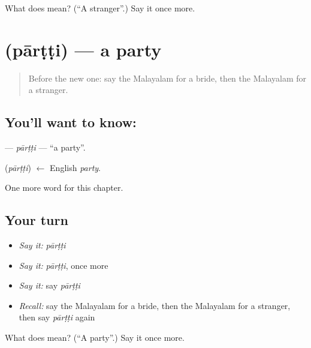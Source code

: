 \begin{tcolorbox}[breakable,colback=teal!4,colframe=teal!35!black,title={Before you move on}]
What does  mean? (\textquotedblleft{}A stranger\textquotedblright{}.) Say it once more.
\end{tcolorbox}
\section[\texorpdfstring{\ml{പാർട്ടി} (pārṭṭi)}{പാർട്ടി (pārṭṭi)}]{ (pārṭṭi) — a party}

\label{lesson:ML-C211-partti}



\begin{quote}
Before the new one: say the Malayalam for a bride, then the Malayalam for a stranger.
\end{quote}

\subsection*{You'll want to know: }
\textbf{} — \emph{pārṭṭi} — \textquotedblleft{}a party\textquotedblright{}.

\begin{cousinweb}
\textbf{} (\emph{pārṭṭi}) $\leftarrow$ English \emph{party}.
\end{cousinweb}

\begin{grammarlens}[title={What you've built}]
One more word for this chapter.
\end{grammarlens}

\subsection*{Your turn}
\begin{itemize}
\raggedright
  \item \emph{Say it:} \emph{pārṭṭi}
  \item \emph{Say it:} \emph{pārṭṭi}, once more
  \item \emph{Say it:} say \emph{pārṭṭi}
  \item \emph{Recall:} say the Malayalam for a bride, then the Malayalam for a stranger, then say \emph{pārṭṭi} again
\end{itemize}

\begin{tcolorbox}[breakable,colback=teal!4,colframe=teal!35!black,title={Before you move on}]
What does  mean? (\textquotedblleft{}A party\textquotedblright{}.) Say it once more.
\end{tcolorbox}
